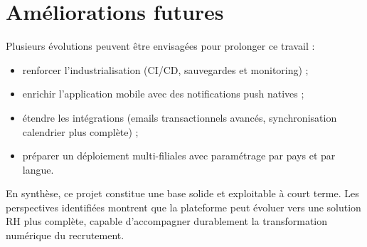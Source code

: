 \section*{Améliorations futures}

Plusieurs évolutions peuvent être envisagées pour prolonger ce travail :
\begin{itemize}
    \item renforcer l'industrialisation (CI/CD, sauvegardes et monitoring) ;
    \item enrichir l'application mobile avec des notifications push natives ;
    \item étendre les intégrations (emails transactionnels avancés,
    synchronisation calendrier plus complète) ;
    \item préparer un déploiement multi-filiales avec paramétrage par pays
    et par langue.
\end{itemize}

En synthèse, ce projet constitue une base solide et exploitable à court
terme. Les perspectives identifiées montrent que la plateforme peut évoluer
vers une solution RH plus complète, capable d'accompagner durablement la
transformation numérique du recrutement.
